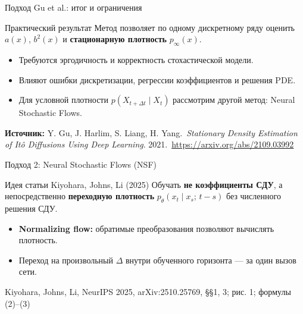 \documentclass[10pt,aspectratio=169]{beamer}
\newcommand{\nsfsrc}[1]{\vfill{\tiny\color{graytext}Kiyohara, Johns, Li, NeurIPS 2025, arXiv:2510.25769, #1}}
\begin{document}
\begin{frame}{Подход Gu et al.: итог и ограничения}
\vspace{0.22cm}
\begin{block}{Практический результат}
Метод позволяет по одному дискретному ряду оценить $a(x)$, $b^2(x)$ и \textbf{стационарную плотность} $p_\infty(x)$.
\end{block}
\vspace{0.15cm}
\begin{itemize}\setlength\itemsep{0.28cm}
\item Требуются эргодичность и корректность стохастической модели.
\item Влияют ошибки дискретизации, регрессии коэффициентов и решения PDE.
\item Для условной плотности $p(X_{t+\Delta t}\mid X_t)$ рассмотрим другой метод: Neural Stochastic Flows.
\end{itemize}
\vfill
{\small\bfseries Источник:} {\small Y. Gu, J. Harlim, S. Liang, H. Yang.\ \textit{Stationary Density Estimation of It\^o Diffusions Using Deep Learning}. 2021.\ \url{https://arxiv.org/abs/2109.03992}}
\end{frame}


\begin{frame}{Подход 2: Neural Stochastic Flows (NSF)}
\vspace{0.04cm}
\begin{block}{Идея статьи Kiyohara, Johns, Li (2025)}
Обучать \textbf{не коэффициенты СДУ}, а непосредственно \textbf{переходную плотность} $p_\theta(x_t\mid x_s;\,t-s)$ без численного решения СДУ.
\end{block}
\vspace{0.10cm}
\begin{center}
\end{center}
\vspace{0.14cm}
\begin{itemize}\setlength\itemsep{0.14cm}
\item \textbf{Normalizing flow:} обратимые преобразования позволяют вычислять плотность.
\item Переход на произвольный $\Delta$ внутри обученного горизонта --- за один вызов сети.
\end{itemize}
\nsfsrc{\S\S 1, 3; рис. 1; формулы (2)--(3)}
\end{frame}
\end{document}
